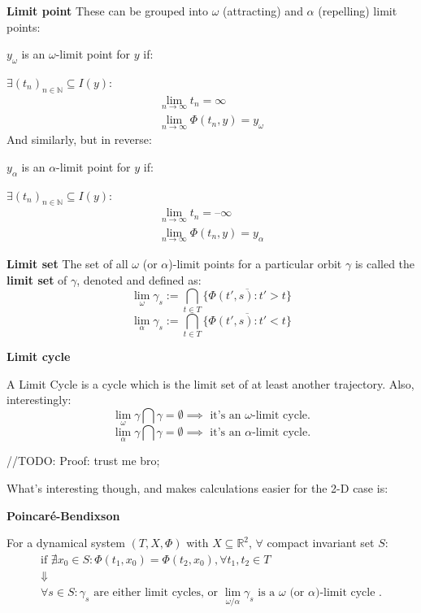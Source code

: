 \begin{definition}\textbf{Limit point}
  These can be grouped into $\omega$ (attracting) and $\alpha$ (repelling) limit points:

  $y_\omega$ is an $\omega$-limit point  for $y$ if:

  $\exists (t_n)_{n \in \mathbb{N}} \subseteq I(y) : $
  \begin{gather*}
    \lim_{n \rightarrow \infty} t_n = \infty  \\
    \lim_{n \rightarrow \infty} \Phi(t_n,y) = y_\omega
  \end{gather*}
  And similarly, but in reverse:

  $y_\alpha$ is an $\alpha$-limit point  for $y$ if:

  $\exists (t_n)_{n \in \mathbb{N}} \subseteq I(y) : $
  \begin{gather*}
    \lim_{n \rightarrow \infty} t_n = \textbf{--} \infty  \\
    \lim_{n \rightarrow \infty} \Phi(t_n,y) = y_\alpha
  \end{gather*}
\end{definition}

\begin{definition}\textbf{Limit set}
  The set of all $\omega$ (or $\alpha$)-limit points for a particular orbit $\gamma$ is called the \textbf{limit set} of $\gamma$, denoted and defined as:
  \[
    \lim_{\omega}\gamma_s := \bigcap_{t \in T} \overline{ \{ \Phi(t', s) : t' > t \} }
  \]
  \[
    \lim_{\alpha}\gamma_s := \bigcap_{t \in T} \overline{ \{ \Phi(t', s) : t' < t \} }
  \]
\end{definition}

\begin{definition} \textbf{Limit cycle}

  A Limit Cycle is a cycle which is the limit set of at least another trajectory.
  Also, interestingly:
  \[
    \lim_{\omega}\gamma \bigcap \gamma  = \emptyset \implies \text{ it's an } \omega \text{-limit cycle}.
  \]
  \[
    \lim_{\alpha}\gamma \bigcap \gamma  = \emptyset \implies \text{ it's an } \alpha \text{-limit cycle}.
  \]
\end{definition}

//TODO: Proof: trust me bro;

What's interesting though, and makes calculations easier for the 2-D case is:
\begin{theorem}  \textbf{Poincaré-Bendixson}

  For a dynamical system $(T,X,\Phi)$ with $X \subseteq \mathbb{R}^2$, $\forall$ compact invariant set $S$:
  \begin{gather*}
    \text{if } \nexists x_0 \in S : \Phi(t_1, x_0) = \Phi(t_2,x_0), \forall t_1,t_2 \in T \\
    \Downarrow \\
    \forall s \in S: \gamma_s \text{ are either limit cycles, or } \lim_{\omega / \alpha}\gamma_s \text{ is a $\omega$ (or $\alpha$)-limit cycle }.
  \end{gather*}
\end{theorem}

